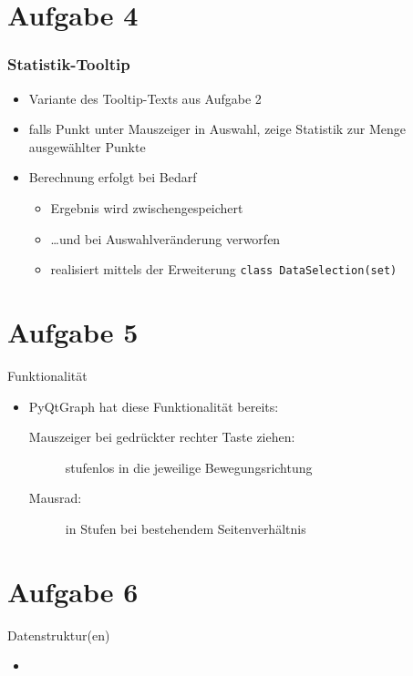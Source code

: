 \documentclass{beamer}
\begin{document}
    \section{Aufgabe 4}
    \begin{frame}[containsverbatim]
    	\frametitle{Statistik-Tooltip}
    	\begin{itemize}
    		\item Variante des Tooltip-Texts aus Aufgabe 2
    		\item falls Punkt unter Mauszeiger in Auswahl, zeige Statistik zur Menge ausgewählter Punkte
    		\item Berechnung erfolgt bei Bedarf
    			\begin{itemize}
    				\item Ergebnis wird zwischengespeichert
    				\item \ldots und bei Auswahlveränderung verworfen
    				\item realisiert mittels der Erweiterung \lstinline{class DataSelection(set)}
    			\end{itemize}
    	\end{itemize}
    \end{frame}

    \section{Aufgabe 5}
    \begin{frame}{Funktionalität}
    	\begin{itemize}
    		\setlength\itemsep{1em}
    		\item PyQtGraph hat diese Funktionalität bereits:
		  		\begin{description}
						\item[Mauszeiger bei gedrückter rechter Taste ziehen:] stufenlos in die jeweilige Bewegungsrichtung
						\item[Mausrad:] in Stufen bei bestehendem Seitenverhältnis
					\end{description}
    	\end{itemize}
    \end{frame}

    \section{Aufgabe 6}
    \begin{frame}{Datenstruktur(en)}
    	\begin{itemize}
    		\setlength\itemsep{1em}
    		\item
    	\end{itemize}
    \end{frame}
\end{document}
